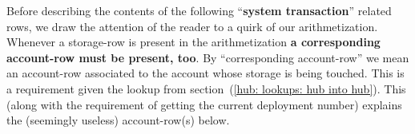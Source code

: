 \begin{center}
\end{center}
Before describing the contents of the following ``\textbf{system transaction}'' related rows,
we draw the attention of the reader to a quirk of our arithmetization.
Whenever a storage-row is present in the arithmetization
\textbf{a corresponding account-row must be present, too}.
By ``corresponding account-row'' we mean an account-row associated to the account whose storage is being touched.
This is a requirement given the lookup from
section~(\ref{hub: lookups: hub into hub}).
This (along with the requirement of getting the current deployment number)
explains the (seemingly useless) account-row(s) below.
\begin{description}
		
		
		
\end{description}
